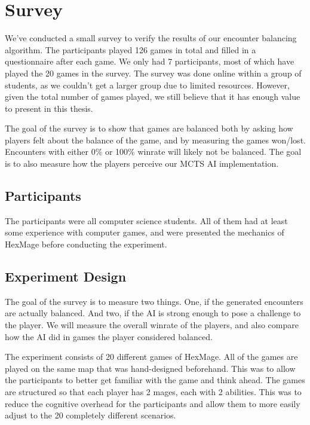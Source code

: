 \section{Survey}
\label{survey}

We've conducted a small survey to verify the results of our encounter balancing algorithm. The participants played 126 games in total and filled in a questionnaire after each game. We only had 7 participants, most of which have played the 20 games in the survey. The survey was done online within a group of students, as we couldn't get a larger group due to limited resources. However, given the total number of games played, we still believe that it has enough value to present in this thesis.

The goal of the survey is to show that games are balanced both by asking how players felt about the balance of the game, and by measuring the games won/lost. Encounters with either 0\% or 100\% winrate will likely not be balanced. The goal is to also measure how the players perceive our MCTS AI implementation.

\subsection{Participants}

The participants were all computer science students. All of them had at least
some experience with computer games, and were presented the mechanics of HexMage
before conducting the experiment.

\subsection{Experiment Design}

The goal of the survey is to measure two things. One, if the generated
encounters are actually balanced. And two, if the AI is strong enough to pose a
challenge to the player. We will measure the overall winrate of the players,
and also compare how the AI did in games the player considered balanced.

The experiment consists of 20 different games of HexMage. All of the games are
played on the same map that was hand-designed beforehand. This was to allow the
participants to better get familiar with the game and think ahead. The games
are structured so that each player has 2 mages, each with 2 abilities. This was
to reduce the cognitive overhead for the participants and allow them to more easily
adjust to the 20 completely different scenarios. 


